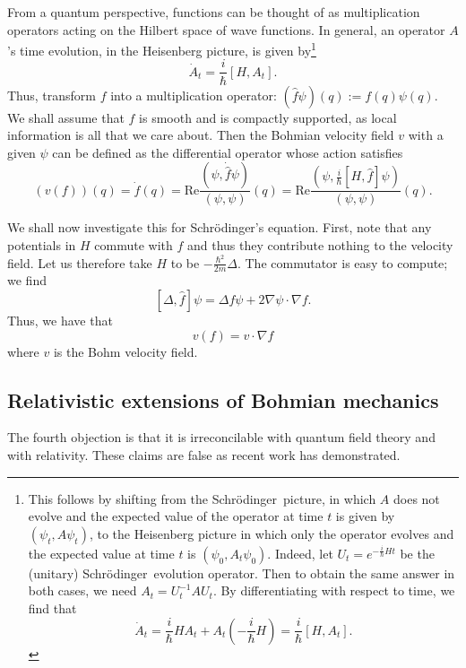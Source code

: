 \documentclass[11pt]{article}
\theoremstyle{remark}
\begin{document}
\begin{enumerate}
From a quantum perspective, functions can be thought of as
multiplication operators acting on the Hilbert space of wave functions. In
general, an operator $A$'s time evolution, in the Heisenberg picture, is
given by\footnote{
This follows by shifting from the Schr\"odinger\ picture, in which $A$ does
not evolve and the expected value of the operator at time $t$ is given
by \ensuremath{({\ensuremath{\psi}_t}, {A \ensuremath{\psi}_t})}, to the Heisenberg picture in which only the
operator evolves and the expected value at time $t$ is \ensuremath{({\ensuremath{\psi}_0}, {A_t
\ensuremath{\psi}_0})}. Indeed, let $U_t = e^{-\frac{i}{\hbar}Ht}$ be the (unitary) Schr\"odinger\
evolution operator. Then to 
obtain the same answer in both cases, we need $A_t = U_t^{-1} A
U_t$.
By differentiating with respect to time, we find that 
\[\dot{A}_t =
\frac{i}{\hbar} H A_t + A_t (-\frac{i}{\hbar} H)= \frac{i}{\hbar}
[H,A_t].\]
} 
\[ \dot{A}_t = \frac{i}{\ensuremath{\hbar}} [H, A_t].
 \]
Thus, transform $f$ into a multiplication operator: $(\hat{f} \ensuremath{\psi}
)(q) \ensuremath{:=} f(q) \ensuremath{\psi}(q).$ We shall assume that $f$ is smooth and is
compactly supported, as local information is all that we care about. Then
the Bohmian velocity field $v$ with a given $\ensuremath{\psi}$ 
can be defined as the differential
operator whose action satisfies
\[ 
(v (f))(q) = \dot{f} (q) = \textrm{Re}
\frac{\ensuremath{({\ensuremath{\psi}}, {\dot{\hat{f}} \ensuremath{\psi}})}}{\ensuremath{({\ensuremath{\psi}}, {\ensuremath{\psi}})}} (q) 
=  \textrm{Re} 
\frac{\ensuremath{({\ensuremath{\psi}}, {\frac{i}{\hbar} [H,\hat f] \ensuremath{\psi}})}}{\ensuremath{({\ensuremath{\psi}}, {\ensuremath{\psi}})}} (q).
\]

We shall now investigate this for Schr\"odinger's equation. First, note that any
potentials in $H$ commute with $f$ and thus they contribute nothing to
the velocity field. Let us therefore take $H$ to be $-\frac{\ensuremath{\hbar}^2}{2m}
\ensuremath{\Delta}$. 
The commutator is easy to compute; we find
\[
[\ensuremath{\Delta}, \hat{f}] \ensuremath{\psi} =  \ensuremath{\Delta} f \ensuremath{\psi} + 2 \nabla \ensuremath{\psi} \cdot \nabla f . 
\]
Thus, we have that 
\[
v(f) = v \cdot \nabla f
\]
where $v$ is the Bohm velocity field.


\end{enumerate}

\subsection{Relativistic extensions of Bohmian mechanics}
The fourth objection is that it is irreconcilable with quantum field
theory and with relativity. These claims are false as recent work has
demonstrated. 
\end{document}
